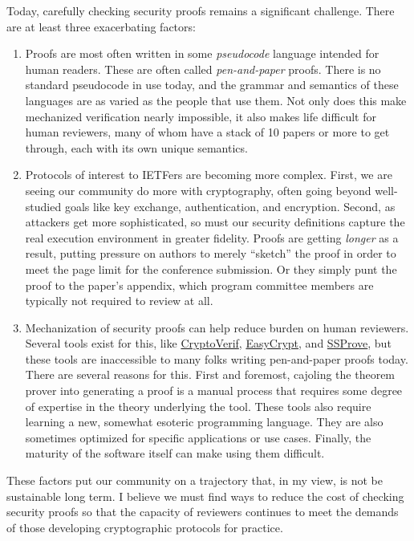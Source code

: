 \documentclass{article}
\begin{document}
Today, carefully checking security proofs remains a significant challenge.
There are at least three exacerbating factors:
%
\begin{enumerate}

  \item Proofs are most often written in some \emph{pseudocode} language
    intended for human readers. These are often called \emph{pen-and-paper}
    proofs.
    There is no standard pseudocode in use today, and the grammar and
    semantics of these languages are as varied as the people that use them.
    Not only does this make mechanized verification nearly impossible, it also
    makes life difficult for human reviewers, many of whom have a stack of
    10 papers or more to get through, each with its own unique semantics.

  \item Protocols of interest to IETFers are becoming more complex.
    First, we are seeing our community do more with cryptography, often going
    beyond well-studied goals like key exchange, authentication, and
    encryption.
    Second, as attackers get more sophisticated, so must our security definitions
    capture the real execution environment in greater fidelity.
    Proofs are getting \emph{longer} as a result, putting pressure on authors
    to merely ``sketch'' the proof in order to meet the page limit for the
    conference submission. Or they simply punt the proof to the paper's
    appendix, which program committee members are typically not required to
    review at all.

  \item Mechanization of security proofs can help reduce burden on human
    reviewers.
    Several tools exist for this, like
    \href{https://bblanche.gitlabpages.inria.fr/CryptoVerif/}{CryptoVerif},
    \href{https://github.com/EasyCrypt/easycrypt}{EasyCrypt}, and
    \href{https://github.com/SSProve/ssprove}{SSProve}, but these tools
    are inaccessible to many folks writing pen-and-paper proofs today.
    There are several reasons for this.
    First and foremost, cajoling the theorem prover into generating a proof is
    a manual process that requires some degree of expertise in the theory
    underlying the tool.
    These tools also require learning a new, somewhat esoteric programming
    language. They are also sometimes optimized for specific applications or
    use cases. Finally, the maturity of the software itself can make using them
    difficult.

\end{enumerate}
%
These factors put our community on a trajectory that, in my view, is not be
sustainable long term.
%
I believe we must find ways to reduce the cost of checking security proofs so
that the capacity of reviewers continues to meet the demands of those
developing cryptographic protocols for practice.
\end{document}
